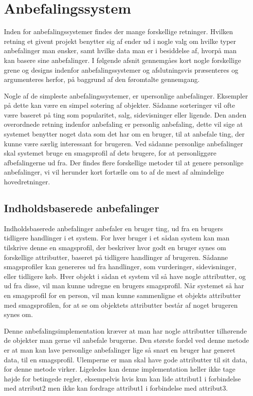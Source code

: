 \section{Anbefalingssystem}
Inden for anbefalingssystemer findes der mange forskellige retninger.
Hvilken retning et givent projekt benytter sig af ender ud i nogle valg om hvilke typer anbefalinger man ønsker, samt hvilke data man er i besiddelse af, hvorpå man kan basere sine anbefalinger.
I følgende afsnit gennemgåes kort nogle forskellige grene og designs indenfor anbefalingssystemer og afslutningsvis præsenteres og argumenteres herfor, på baggrund af den føromtalte gennemgang.

Nogle af de simpleste anbefalingssystemer, er upersonlige anbefalinger.
Eksempler på dette kan være en simpel sotering af objekter.
Sådanne sorteringer vil ofte være baseret på ting som popularitet, salg, sidevisninger eller ligende.
Den anden overordnede retning indenfor anbefaling er personlig anbefaling, dette vil sige at systemet benytter noget data som det har om en bruger, til at anbefale ting, der kunne være særlig interessant for brugeren.
Ved sådanne personlige anbefalinger skal systemet bruge en smagsprofil af dets brugere, for at personliggøre afbefalingerne ud fra.
Der findes flere forskellige metoder til at genere personlige anbefalinger, vi vil herunder kort fortælle om to af de mest af almindelige hovedretninger.

\subsection{Indholdsbaserede anbefalinger}
Indholdsbaserede anbefalinger anbefaler en bruger ting, ud fra en brugers tidligere handlinger i et system.
For hver bruger i et sådan system kan man tilskrive denne en smagsprofil, der beskriver hvor godt en bruger synes om forskellige attributter, baseret på tidligere handlinger af brugeren.
Sådanne smagsprofiler kan genereres ud fra handlinger, som vurderinger, sidevisninger, eller tidligere køb.
Hver objekt i sådan et system vil så have nogle attributter, og ud fra disse, vil man kunne udregne en brugers smagsprofil.
Når systemet så har en smagsprofil for en person, vil man kunne sammenligne et objekts attributter med smagsprofilen, for at se om objektets attributter består af noget brugeren synes om.

Denne anbefalingsimplementation kræver at man har nogle attributter tilhørende de objekter man gerne vil anbefale brugerne.
Den største fordel ved denne metode  er at man kan lave personlige anbefalinger lige så snart en bruger har generet data, til en smagsprofil.
Ulemperne er man skal have gode attributter til sit data, for denne metode virker. Ligeledes kan denne implementation heller ikke tage højde for betingede regler, eksempelvis hvis kun kan lide attribut1 i forbindelse med atrribut2 men ikke kan fordrage attribut1 i forbindelse med attribut3.



